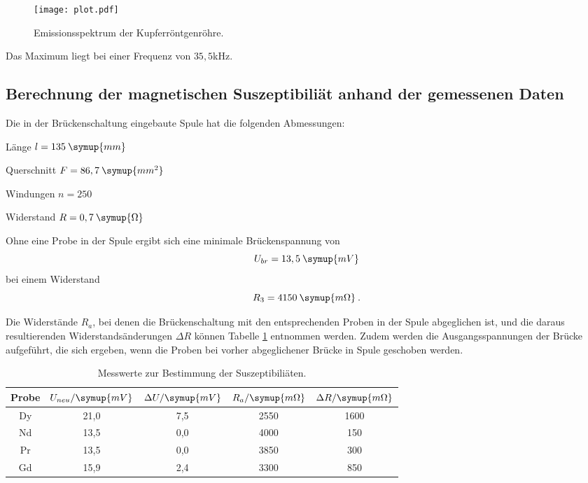 \begin{figure}[H]
  \centering
  \texttt{[image: plot.pdf]}
  \caption{Emissionsspektrum der Kupferröntgenröhre.}
  \label{fig:plot}
\end{figure}

Das Maximum liegt bei einer Frequenz von $35,5$kHz.


\subsection{Berechnung der magnetischen Suszeptibiliät anhand der gemessenen Daten}
Die in der Brückenschaltung eingebaute Spule hat die folgenden Abmessungen:

Länge $l = 135 \: \symup{mm}$

Querschnitt $F = 86,7 \: \symup{mm^2}$

Windungen $n = 250$

Widerstand $R = 0,7 \: \symup{\Omega}$

Ohne eine Probe in der Spule ergibt sich eine minimale Brückenspannung von
\begin{equation*}
  U_{br} = 13,5 \: \symup{mV}
\end{equation*}
bei einem Widerstand
\begin{equation*}
  R_3 = 4150 \: \symup{m\Omega} \: .
\end{equation*}

Die Widerstände $R_a$, bei denen die Brückenschaltung mit den entsprechenden Proben
in der Spule abgeglichen ist, und die daraus resultierenden Widerstandsänderungen $\Delta R$ können
Tabelle \ref{tab:Widerstand} entnommen werden. Zudem werden die Ausgangsspannungen der Brücke aufgeführt,
die sich ergeben, wenn die Proben bei vorher abgeglichener Brücke in Spule geschoben werden.
\begin{table}[H]
  \centering
  \caption{Messwerte zur Bestimmung der Suszeptibiliäten.}
  \label{tab:Widerstand}
  \begin{tabular}{c c c c c}
    \toprule
    Probe & $U_{neu} / \symup{mV}$ & $\Delta U / \symup{mV}$ &  $R_a / \symup{m\Omega}$   & $\Delta R / \symup{m\Omega}$  \\
    \midrule
    Dy & 21,0 & 7,5 & 2550 & 1600 \\
    Nd & 13,5 & 0,0 & 4000 & 150 \\
    Pr & 13,5 & 0,0 & 3850 & 300 \\
    Gd & 15,9 & 2,4 & 3300 & 850 \\
    \bottomrule
  \end{tabular}
\end{table}


